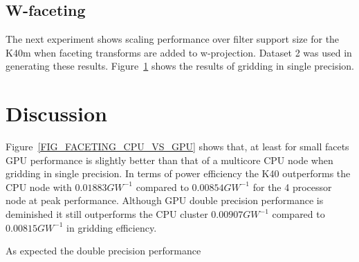 \subsection{W-faceting}
The next experiment shows scaling performance over filter support size for the K40m 
when faceting transforms are added to w-projection. Dataset 2 was used in generating
these results. Figure~\ref{FIG_FACET_VS_NO_FACET_GPU} shows the results of gridding in
single precision.
\begin{figure}[ht!]
 \begin{mdframed}
 \centering
  \caption[]{}
  \label{FIG_FACET_VS_NO_FACET_GPU}
  \end{mdframed}
\end{figure}
\section{Discussion}
Figure~\ref{FIG_FACETING_CPU_VS_GPU} shows that, at least for small facets GPU performance is slightly better than that of a multicore CPU node when gridding in
single precision. In terms of power efficiency the K40 outperforms the CPU node with $0.01883 GW^{-1}$ compared to $0.00854 GW^{-1}$ for the
4 processor node at peak performance. Although GPU double precision performance is deminished it still outperforms the CPU cluster $0.00907 GW^{-1}$ 
compared to $0.00815 GW^{-1}$ in gridding efficiency.

As expected the double precision performance  



